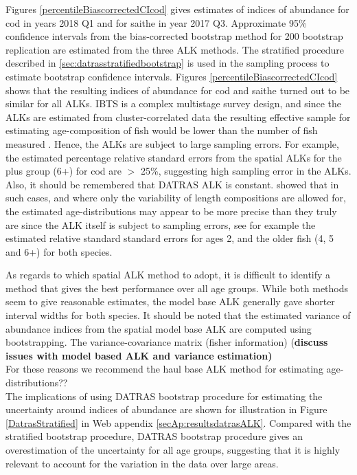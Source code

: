 \documentclass[a4paper 12pt]{article}
\numberwithin{equation}{section}
\begin{document}
\clearpage
Figures \ref{percentileBiascorrectedCIcod} gives estimates of indices of abundance for cod in years 2018 Q1 and for saithe in year 2017 Q3. Approximate 95\% confidence intervals from the bias-corrected bootstrap method for 200 bootstrap replication are estimated from the three ALK methods. The stratified procedure described in \ref{sec:datrasstratifiedbootstrap} is used in the sampling process to estimate bootstrap confidence intervals.   Figures \ref{percentileBiascorrectedCIcod}  shows that the resulting indices of abundance for cod and saithe turned out to be similar for all ALKs. IBTS is a complex multistage survey design, and since the ALKs are estimated from cluster-correlated data the resulting effective sample for estimating age-composition of fish would be lower than the number of fish measured \citep{ICES2013PICS3}. Hence, the ALKs are subject to large sampling errors. For example, the estimated percentage relative standard errors from the spatial ALKs for the plus group (6+) for cod are $>$ 25\%, suggesting high sampling error in the ALKs. Also, it should be remembered that DATRAS ALK is constant.   \citet{aanes2015efficient} showed that in such cases, and where only the variability of  length compositions are allowed for, the estimated age-distributions may appear to be more precise than they truly are since the ALK itself is subject to sampling errors, see for example the estimated relative standard standard errors for ages 2, and the older fish (4, 5 and 6+) for both species. 

As regards to which spatial ALK method to adopt, it is difficult to identify a method that gives the best performance over all age groups. While both methods seem to give reasonable estimates, the model base ALK generally gave shorter interval widths for both species. It should be noted that the estimated variance of abundance indices from the spatial model base ALK are computed using bootstrapping. The variance-covariance matrix (fisher information) {(\bf discuss issues with model based ALK and variance estimation)} \\

For these reasons we recommend the haul base ALK method for estimating age-distributions??\\

The implications of using DATRAS bootstrap procedure for estimating the uncertainty around indices of abundance are shown for illustration  in Figure \ref{DatrasStratified} in Web appendix \ref{secAp:resultsdatrasALK}. Compared with the stratified bootstrap procedure, DATRAS bootstrap procedure gives an overestimation of the uncertainty for all age groups, suggesting that it is highly relevant to account for the variation in the data over large areas. 
\end{document}
